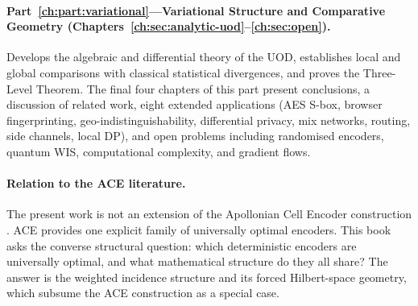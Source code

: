 \paragraph{Part~\ref{ch:part:variational}---Variational Structure and Comparative Geometry
(Chapters~\ref{ch:sec:analytic-uod}--\ref{ch:sec:open}).}
Develops the algebraic and differential theory of the UOD, establishes
local and global comparisons with classical statistical divergences,
and proves the Three-Level Theorem.  The final four chapters of this part
present conclusions, a discussion of related work, eight extended
applications (AES S-box, browser fingerprinting, geo-indistinguishability,
differential privacy, mix networks, routing, side channels, local DP),
and open problems including randomised encoders, quantum WIS,
computational complexity, and gradient flows.

\paragraph{Relation to the ACE literature.}
The present work is not an extension of the Apollonian Cell Encoder
construction \cite{biondi2018apollonian}.  ACE provides one explicit
family of universally optimal encoders.  This book asks the converse
structural question: which deterministic encoders are universally
optimal, and what mathematical structure do they all share?  The answer
is the weighted incidence structure and its forced Hilbert-space
geometry, which subsume the ACE construction as a special case.
\endinput